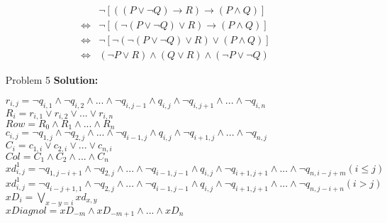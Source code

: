 \normalfont\documentclass[letterpaper,11pt]{article}
\begin{document}
\begin{enumerate}
\begin{align*}
	&\neg[((P\lor \neg Q)\to R)\to(P\land Q)]\\
	\Leftrightarrow& \neg[(\neg(P\lor \neg Q)\lor R)\to(P\land Q)]\\
	\Leftrightarrow& \neg[\neg(\neg(P\lor \neg Q)\lor R)\lor(P\land Q)]\\
	\Leftrightarrow& (\neg P\lor R)\land (Q \lor R) \land (\neg P \lor \neg Q)
\end{align*}
\item[Problem 5]\textbf{Solution:}\par
		$r_{i,j} = \neg q_{i,1}\land \neg q_{i,2}\land ... \land \neg q_{i,j-1} \land q_{i,j} \land \neg q_{i,j+1}\land...\land \neg q_{i,n}$\\
		$R_i = r_{i,1} \lor r_{i,2} \lor ... \lor r_{i,n}$\\
		$Row = R_0 \land R_1 \land ... \land R_n$\\

		$c_{i,j} = \neg q_{1,j}\land \neg q_{2,j}\land ... \land \neg q_{i-1,j} \land q_{i,j} \land \neg q_{i+1,j}\land...\land \neg q_{n,j}$\\
		$C_i = c_{1,i} \lor c_{2,i} \lor ... \lor c_{n,i}$\\
		$Col = C_1 \land C_2 \land ... \land C_n$\\

		$xd^1_{i,j} = \neg q_{1,j-i+1}\land \neg q_{2,j}\land ... \land \neg q_{i-1,j-1} \land q_{i,j} \land \neg q_{i+1,j+1}\land...\land \neg q_{n,i-j+m} (i\le j)$\\
		$xd^1_{i,j} = \neg q_{i-j+ 1,1}\land \neg q_{2,j}\land ... \land \neg q_{i-1,j-1} \land q_{i,j} \land \neg q_{i+1,j+1}\land...\land \neg q_{n,j -i + n}(i > j)$\\
		$xD_i = \bigvee  \limits_{x - y = i} xd_{x,y}$\\
		$xDiagnol = xD_{-m} \land xD_{-m+1} \land ... \land xD_n$\\


\end{enumerate}
\end{document}
